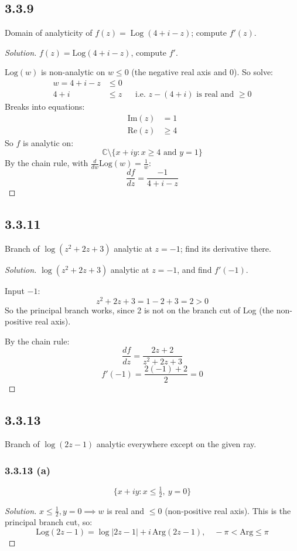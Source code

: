 \documentclass{article}
\newenvironment{solution}{
\begin{proof}[Solution]}{
\end{proof}}
\begin{document}
\subsection*{3.3.9}
Domain of analyticity of $f(z) = \operatorname{Log}(4 + i - z)$; compute $f'(z)$.
\begin{solution}
  $f(z)=\text{Log}(4+i-z)$, compute $f'$.

  $\text{Log}(w)$ is non-analytic on $w\leq0$ (the negative real axis and 0).
  So solve:
  \begin{align*}
    w=4+i-z & \leq 0 \\
    4+i & \leq z && \text{i.e. } z-(4+i) \text{ is real and } \geq0
  \end{align*}
  Breaks into equations:
  \begin{align*}
    \text{Im}(z) & = 1 \\
    \text{Re}(z) & \geq 4
  \end{align*}
  So $f$ is analytic on:
  \[
    \mathbb{C}\setminus\{x+iy : x\geq4 \text{ and } y=1\}
  \]
  By the chain rule, with $\frac{d}{dw}\text{Log}(w)=\frac{1}{w}$:
  \[
    \frac{df}{dz}=\frac{-1}{4+i-z}
  \]
\end{solution}

\subsection*{3.3.11}
Branch of $\log(z^2 + 2z + 3)$ analytic at $z = -1$; find its derivative there.
\begin{solution}
  $\log(z^2+2z+3)$ analytic at $z=-1$, and find $f'(-1)$.

  Input $-1$:
  \[
    z^2+2z+3=1-2+3=2>0
  \]
  So the principal branch works, since 2 is not on the branch cut of Log (the non-positive real axis).

  By the chain rule:
  \[
    \frac{df}{dz}=\frac{2z+2}{z^2+2z+3}
  \]
  \[
    f'(-1)=\frac{2(-1)+2}{2}=0
  \]
\end{solution}

\subsection*{3.3.13}
Branch of $\log(2z - 1)$ analytic everywhere except on the given ray.

\subsubsection*{3.3.13 (a)}
\[ \{x + iy : x \le \tfrac{1}{2},\ y = 0\} \]
\begin{solution}
  $x\leq\frac{1}{2}, y=0 \implies w$ is real and $\leq0$ (non-positive real axis).
  This is the principal branch cut, so:
  \[
    \text{Log}(2z-1)=\log|2z-1|+i\,\text{Arg}(2z-1), \quad -\pi<\text{Arg}\leq\pi
  \]
\end{solution}
\end{document}
